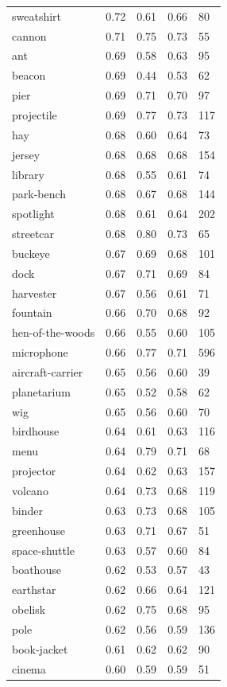 \begin{center}
\begin{longtable}{lllll}
sweatshirt & 0.72 & 0.61 & 0.66 & 80 \\
cannon & 0.71 & 0.75 & 0.73 & 55 \\
ant & 0.69 & 0.58 & 0.63 & 95 \\
beacon & 0.69 & 0.44 & 0.53 & 62 \\
pier & 0.69 & 0.71 & 0.70 & 97 \\
projectile & 0.69 & 0.77 & 0.73 & 117 \\
hay & 0.68 & 0.60 & 0.64 & 73 \\
jersey & 0.68 & 0.68 & 0.68 & 154 \\
library & 0.68 & 0.55 & 0.61 & 74 \\
park-bench & 0.68 & 0.67 & 0.68 & 144 \\
spotlight & 0.68 & 0.61 & 0.64 & 202 \\
streetcar & 0.68 & 0.80 & 0.73 & 65 \\
buckeye & 0.67 & 0.69 & 0.68 & 101 \\
dock & 0.67 & 0.71 & 0.69 & 84 \\
harvester & 0.67 & 0.56 & 0.61 & 71 \\
fountain & 0.66 & 0.70 & 0.68 & 92 \\
hen-of-the-woods & 0.66 & 0.55 & 0.60 & 105 \\
microphone & 0.66 & 0.77 & 0.71 & 596 \\
aircraft-carrier & 0.65 & 0.56 & 0.60 & 39 \\
planetarium & 0.65 & 0.52 & 0.58 & 62 \\
wig & 0.65 & 0.56 & 0.60 & 70 \\
birdhouse & 0.64 & 0.61 & 0.63 & 116 \\
menu & 0.64 & 0.79 & 0.71 & 68 \\
projector & 0.64 & 0.62 & 0.63 & 157 \\
volcano & 0.64 & 0.73 & 0.68 & 119 \\
binder & 0.63 & 0.73 & 0.68 & 105 \\
greenhouse & 0.63 & 0.71 & 0.67 & 51 \\
space-shuttle & 0.63 & 0.57 & 0.60 & 84 \\
boathouse & 0.62 & 0.53 & 0.57 & 43 \\
earthstar & 0.62 & 0.66 & 0.64 & 121 \\
obelisk & 0.62 & 0.75 & 0.68 & 95 \\
pole & 0.62 & 0.56 & 0.59 & 136 \\
book-jacket & 0.61 & 0.62 & 0.62 & 90 \\
cinema & 0.60 & 0.59 & 0.59 & 51 \\

\end{longtable}
\end{center}
